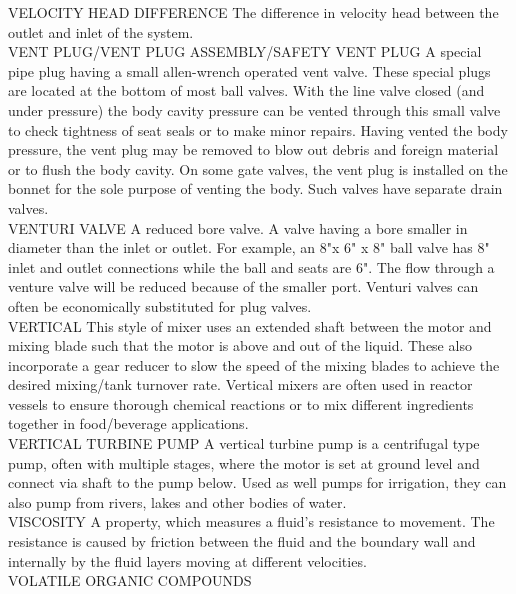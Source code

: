 \documentclass{article}
\begin{document}
VELOCITY HEAD DIFFERENCE
The difference in velocity head between the outlet and inlet of the system.
\vspace{0.3cm}\\
VENT PLUG/VENT PLUG ASSEMBLY/SAFETY VENT PLUG
A special pipe plug having a small allen-wrench operated vent valve. These special plugs are located at the bottom of most ball valves. With the line valve closed (and under pressure) the body cavity pressure can be vented through this small valve to check tightness of seat seals or to make minor repairs. Having vented the body pressure, the vent plug may be removed to blow out debris and foreign material or to flush the body cavity. On some gate valves, the vent plug is installed on the bonnet for the sole purpose of venting the body. Such valves have separate drain valves.
\vspace{0.3cm}\\
VENTURI VALVE
A reduced bore valve. A valve having a bore smaller in diameter than the inlet or outlet. For example, an 8"x 6" x 8" ball valve has 8" inlet and outlet connections while the ball and seats are 6". The flow through a venture valve will be reduced because of the smaller port. Venturi valves can often be economically substituted for plug valves.
\vspace{0.3cm}\\
VERTICAL
This style of mixer uses an extended shaft between the motor and mixing blade such that the motor is above and out of the liquid. These also incorporate a gear reducer to slow the speed of the mixing blades to achieve the desired mixing/tank turnover rate. Vertical mixers are often used in reactor vessels to ensure thorough chemical reactions or to mix different ingredients together in food/beverage applications.
\vspace{0.3cm}\\
VERTICAL TURBINE PUMP
A vertical turbine pump is a centrifugal type pump, often with multiple stages, where the motor is set at ground level and connect via shaft to the pump below. Used as well pumps for irrigation, they can also pump from rivers, lakes and other bodies of water.
\vspace{0.3cm}\\
VISCOSITY
A property, which measures a fluid’s resistance to movement. The resistance is caused by friction between the fluid and the boundary wall and internally by the fluid layers moving at different velocities.
\vspace{0.3cm}\\
VOLATILE ORGANIC COMPOUNDS
\end{document}
